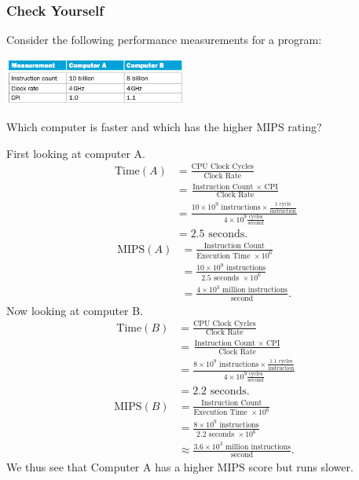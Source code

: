 \documentclass[10pt]{article}
\begin{document}
\subsubsection{Check Yourself}
Consider the following performance measurements for a program:
\begin{center}
\includegraphics[width=6cm]{5.png}
\end{center}
Which computer is faster and which has the higher MIPS rating?
  \begin{tcolorbox}[%
    enhanced, 
    breakable,
    frame hidden,
    overlay broken = {
      
      (frame.north west) rectangle (frame.south east);},
    ]
    First looking at computer A.
\begin{align*}
  \text{ Time}(A) &= \frac{\text{CPU Clock Cycles} }{\text{Clock Rate} }\\
                  &= \frac{\text{Instruction Count }\times \text{ CPI}}{\text{Clock Rate}}\\
                  &= \frac{10 \times 10^9 \text{ instructions} \times \frac{1 \text{ cycle}}{\text{instruction}}}{4\times 10^9 \frac{\text{cycles}}{\text{second}}}\\
  &= 2.5 \text{ seconds}.
\end{align*}
\begin{align*}
  \text{MIPS}(A) &= \frac{\text{Instruction Count}}{\text{Execution Time } \times 10^6}\\
                 &= \frac{10 \times 10^9 \text{ instructions}}{2.5 \text{ seconds } \times 10^6}\\
                 &= \frac{4 \times 10^3 \text{ million instructions}}{\text{second}}.
\end{align*}
Now looking at computer B.
\begin{align*}
 \text{ Time}(B) &= \frac{\text{CPU Clock Cycles} }{\text{Clock Rate} }\\
                  &= \frac{\text{Instruction Count }\times \text{ CPI}}{\text{Clock Rate}}\\
                  &= \frac{8 \times 10^9 \text{ instructions} \times \frac{1.1 \text{ cycles}}{\text{instruction}}}{4\times 10^9 \frac{\text{cycles}}{\text{second}}}\\
  &= 2.2 \text{ seconds}.
\end{align*}
\begin{align*}
  \text{MIPS}(B) &= \frac{\text{Instruction Count}}{\text{Execution Time } \times 10^6}\\
                 &= \frac{8 \times 10^9 \text{ instructions}}{2.2 \text{ seconds } \times 10^6}\\
                 &\approx \frac{3.6 \times 10^3 \text{ million instructions}}{\text{second}}.
\end{align*}
We thus see that Computer A has a higher MIPS score but runs slower.
\end{tcolorbox}
\end{document}
